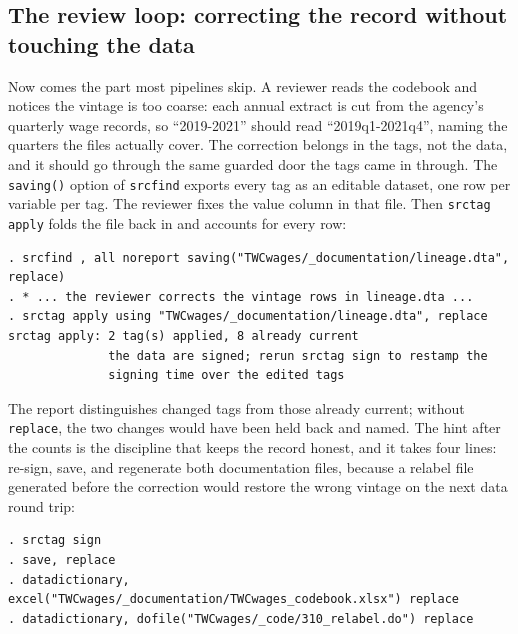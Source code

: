 \subsection{The review loop: correcting the record without touching the data}
Now comes the part most pipelines skip. A reviewer reads the codebook and notices the vintage is too coarse: each annual extract is cut from the agency's quarterly wage records, so \enquote{2019-2021} should read \enquote{2019q1-2021q4}, naming the quarters the files actually cover. The correction belongs in the tags, not the data, and it should go through the same guarded door the tags came in through. The \texttt{saving()} option of \texttt{srcfind} exports every tag as an editable dataset, one row per variable per tag. The reviewer fixes the value column in that file. Then \texttt{srctag apply} folds the file back in and accounts for every row:
\par
{\footnotesize
\begin{verbatim}
. srcfind , all noreport saving("TWCwages/_documentation/lineage.dta", replace)
. * ... the reviewer corrects the vintage rows in lineage.dta ...
. srctag apply using "TWCwages/_documentation/lineage.dta", replace
srctag apply: 2 tag(s) applied, 8 already current
              the data are signed; rerun srctag sign to restamp the
              signing time over the edited tags
\end{verbatim}
}
The report distinguishes changed tags from those already current; without \texttt{replace}, the two changes would have been held back and named. The hint after the counts is the discipline that keeps the record honest, and it takes four lines: re-sign, save, and regenerate both documentation files, because a relabel file generated before the correction would restore the wrong vintage on the next data round trip:
\par
{\footnotesize
\begin{verbatim}
. srctag sign
. save, replace
. datadictionary, excel("TWCwages/_documentation/TWCwages_codebook.xlsx") replace
. datadictionary, dofile("TWCwages/_code/310_relabel.do") replace
\end{verbatim}
}

